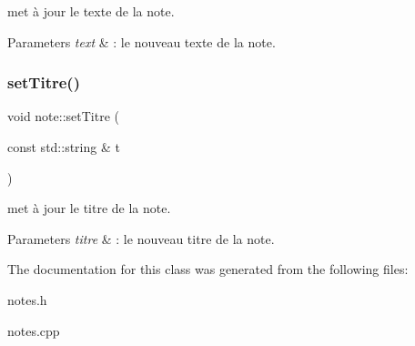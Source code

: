 met à jour le texte de la note. 


\begin{DoxyParams}{Parameters}
{\em text} & \+: le nouveau texte de la note. \\
\hline
\end{DoxyParams}
\mbox{\label{classnote_a70884d3640a6f4440ddb9bd30925b5e7}} 
\subsubsection{\texorpdfstring{set\+Titre()}{setTitre()}}
{\footnotesize\ttfamily void note\+::set\+Titre (\begin{DoxyParamCaption}\item[{const std\+::string \&}]{t }\end{DoxyParamCaption})\hspace{0.3cm}{\ttfamily [inline]}}



met à jour le titre de la note. 


\begin{DoxyParams}{Parameters}
{\em titre} & \+: le nouveau titre de la note. \\
\hline
\end{DoxyParams}


The documentation for this class was generated from the following files\+:\begin{DoxyCompactItemize}
\item 
notes.\+h\item 
notes.\+cpp\end{DoxyCompactItemize}
